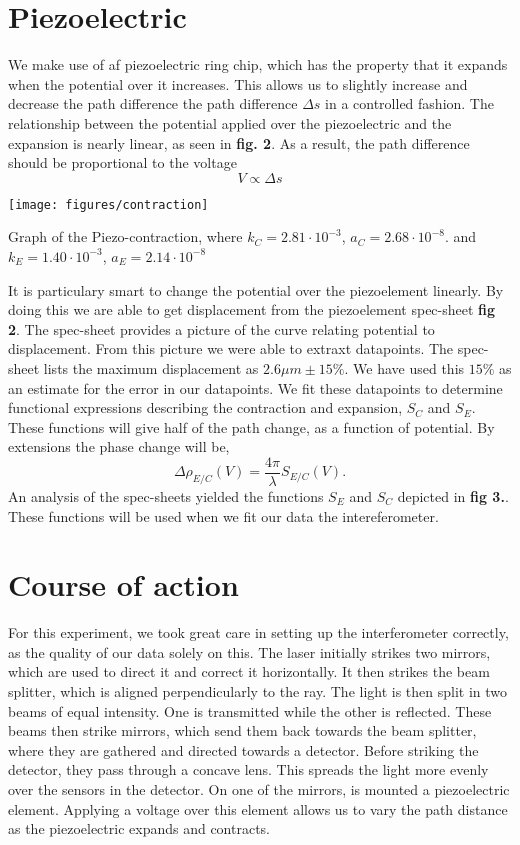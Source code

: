 \documentclass[working, oneside]{inputs/tuftebook}
\begin{document}
\section*{Piezoelectric}
We make use of af piezoelectric ring chip, which has the property that it expands when the potential over it increases. This allows us to slightly increase and decrease the path difference the path difference $\Delta s$ in a controlled fashion. The relationship between the potential applied over the piezoelectric and the expansion is nearly linear, as seen in \textbf{fig. 2}. As a result, the path difference should be proportional to the voltage
\[
V \propto \Delta s
\]
\begin{marginfigure}
	\centering
	\texttt{[image: figures/contraction]}
	\caption{Graph of the Piezo-contraction, where $k_C = 2.81\cdot 10^{-3}$,  $a_C = 2.68 \cdot 10^{-8}$. and \\$k_E = 1.40 \cdot 10^{-3}$, $a_E = 2.14 \cdot 10^{-8}$}
	\label{fig:}
\end{marginfigure}
It is particulary smart to change the potential over the piezoelement linearly. By doing this we are able to get displacement from the piezoelement spec-sheet \textbf{fig 2}. The spec-sheet provides a picture of the curve relating potential to displacement. From this picture we were able to extraxt datapoints. The spec-sheet lists the maximum displacement as $2.6 \mu m \pm 15\%$. We have used this $15\%$ as an estimate for the error in our datapoints. We fit these datapoints to determine functional expressions describing the contraction and expansion, $S_C$ and $S_E$. These functions will give half of the path change, as a function of potential. By extensions the phase change will be,
 \[
\Delta \rho_{E /C} \left( V \right) =  \frac{4\pi}{\lambda}S_{E /C}\left( V \right) 
.\] 
An analysis of the spec-sheets yielded the functions $S_E$ and  $S_C$ depicted in \textbf{fig 3.}. These functions will be used when we fit our data the intereferometer.
\section*{Course of action}
For this experiment, we took great care in setting up the interferometer correctly, as the quality of our data solely on this. The laser initially strikes two mirrors, which are used to direct it and correct it horizontally. It then strikes the beam splitter, which is aligned perpendicularly to the ray. The light is then split in two beams of equal intensity. One is transmitted while the other is reflected. These beams then strike mirrors, which send them back towards the beam splitter, where they are gathered and directed towards a detector. Before striking the detector, they pass through a concave lens. This spreads the light more evenly over the sensors in the detector. On one of the mirrors, is mounted a piezoelectric element. Applying a voltage over this element allows us to vary the path distance as the piezoelectric expands and contracts. 
\end{document}
